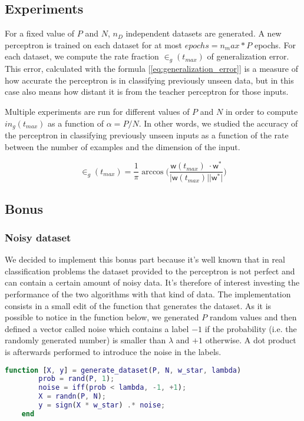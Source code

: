 \subsection{Experiments}
For a fixed value of $P$ and $N$, $n_D$ independent datasets are generated. A new perceptron is trained on each dataset for at most $epochs = n_max * P$ epochs.
For each dataset, we compute the rate fraction $\in_g(t_{max})$ of generalization error. This error, calculated with the formula [\ref{eq:generalization_error}]
is a measure of how accurate the perceptron is in classifying previously unseen data, but in this case also means how distant it is from the teacher perceptron for those inputs.

Multiple experiments are run for different values of $P$ and $N$ in order to compute $in_g(t_{max})$ as a function of $\alpha = P / N$.
In other words, we studied the accuracy of the perceptron in classifying previously unseen inputs as a function of the rate between the number of examples and the dimension of the input.


\begin{equation} \label{eq:generalization_error}
    \in_g(t_{max}) = \frac{1}{\pi} \arccos \bigg(\frac{\bm{\mathsf{w}}(t_{max})\;\cdotp \bm{\mathsf{w}}^*}{\lvert \bm{\mathsf{w}}(t_{max}) \rvert \lvert \bm{\mathsf{w}}^* \rvert} \bigg)
\end{equation}

\subsection{Bonus}
\subsubsection{Noisy dataset}
We decided to implement this bonus part because it's well known that in real classification problems the dataset provided to the perceptron is not perfect and can contain a certain
amount of noisy data. It's therefore of interest investing the performance of the two algorithms with that kind of data. The implementation consists in a small edit of the function
that generates the dataset. As it is possible to notice in the function below, we generated $P$ random values and then defined a vector called noise which contains
a label $-1$ if the probability (i.e. the randomly generated number) is smaller than $\lambda$ and $+1$ otherwise. A dot product is afterwards performed to introduce the noise in
the labels. 

\begin{lstlisting}[language=Matlab]
    function [X, y] = generate_dataset(P, N, w_star, lambda)
        prob = rand(P, 1);
        noise = iff(prob < lambda, -1, +1);
        X = randn(P, N);
        y = sign(X * w_star) .* noise;
    end
\end{lstlisting}